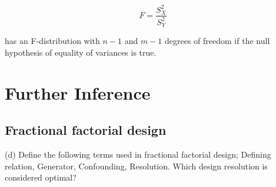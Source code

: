 \begin{equation} F = \frac{S_X^2}{S_Y^2}\end{equation}

has an F-distribution with $n-1$ and $m-1$ degrees of freedom if the null hypothesis of equality of variances is true.


\chapter{Further Inference}

\section{Fractional factorial design}

(d)	Define the following terms used in fractional factorial design; Defining relation,
	Generator, Confounding, Resolution. Which design resolution is considered
	optimal?




